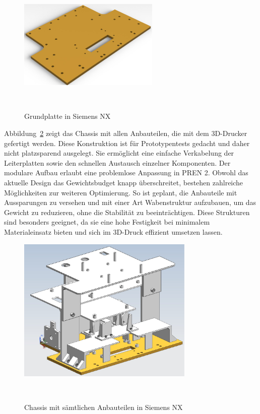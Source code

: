 \documentclass[main.tex]{subfiles} %
\begin{document}
\begin{figure}[H]
    \centering
    \includegraphics[width=0.6\textwidth]{Grundplatte.pdf}
    \caption{Grundplatte in Siemens NX}~\label{fig:Grundplatte}
\end{figure}

Abbildung~\ref{fig:Chassis_komplett} zeigt das Chassis mit allen Anbauteilen,
die mit dem 3D-Drucker gefertigt werden. Diese Konstruktion ist für
Prototypentests gedacht und daher nicht platzsparend ausgelegt. Sie ermöglicht
eine einfache Verkabelung der Leiterplatten sowie den schnellen Austausch
einzelner Komponenten. Der modulare Aufbau erlaubt eine problemlose Anpassung
in PREN 2. Obwohl das aktuelle Design das Gewichtsbudget knapp überschreitet,
bestehen zahlreiche Möglichkeiten zur weiteren Optimierung. So ist geplant, die
Anbauteile mit Aussparungen zu versehen und mit einer Art Wabenstruktur
aufzubauen, um das Gewicht zu reduzieren, ohne die Stabilität zu
beeinträchtigen. Diese Strukturen sind besonders geeignet, da sie eine hohe
Festigkeit bei minimalem Materialeinsatz bieten und sich im 3D-Druck effizient
umsetzen lassen.

\begin{figure}[H]
    \centering
    \includegraphics[width=0.75\textwidth]{Chassis_komplett.pdf}
    \caption{Chassis mit sämtlichen Anbauteilen in Siemens NX}~\label{fig:Chassis_komplett}
\end{figure}
\end{document}
